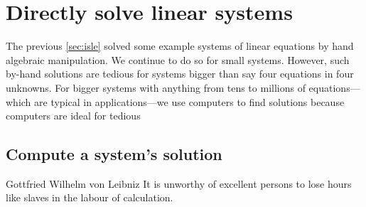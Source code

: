 
\section{Directly solve linear systems}
\label{sec:dmsls}
\secttoc
{}

\begin{comment}
\pooliv{p.64--82}  \layiv{\S1.2} \holti{\S1.2}
\end{comment}




The previous \cref{sec:isle} solved some example systems of linear equations by hand algebraic manipulation.  
We  continue to do so for small systems.  
However, such by-hand solutions are tedious for systems bigger than say four equations in four unknowns.  
For bigger systems with anything from tens to millions of equations---which are typical in applications---we use computers to find solutions because computers are ideal for tedious 


\subsection{Compute a system's solution}

\begin{quoted}{Gottfried Wilhelm von Leibniz}
It is unworthy of excellent persons to lose hours like slaves in the labour of calculation.
\end{quoted}

